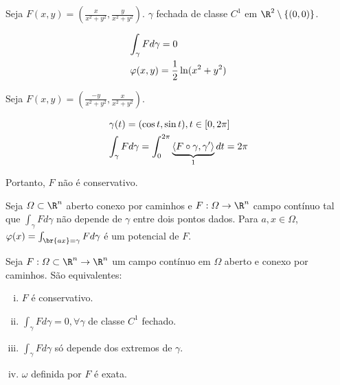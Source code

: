 \documentclass{book}
\begin{document}
\begin{ex}
Seja $F(x,y) = \left( {\frac{x}{{x^2  + y^2 }},\frac{y}{{x^2  + y^2 }}} \right)$. $\gamma$ fechada de classe $C^1$ em $\R^2 \setminus \{ (0,0) \}$.

\[
\begin{gathered}
  \int_\gamma Fd\gamma = 0 \hfill \\
  \varphi(x,y) = \frac{1}{2} \ln(x^2 + y^2) \hfill \\ 
\end{gathered} 
\]
\end{ex}

\begin{ex}
Seja $F(x,y) = \left( \frac{-y}{x^2 + y^2},\frac{x}{x^2 + y^2} \right)$.

\[
\begin{gathered}
  \gamma(t) = (\cos t, \sin t), t \in [0,2\pi] \hfill \\
  \int_\gamma Fd\gamma = \int_0^{2\pi} {\underbrace {\left\langle {F \circ \gamma ,\gamma '} \right\rangle }_1dt} = 2\pi \hfill \\ 
\end{gathered} 
\]

Portanto, $F$ n\~ao \'e conservativo.
\end{ex}

\begin{teo}
Seja $\varOmega \subset \R^n$ aberto conexo por caminhos e $F:\varOmega \to \R^n$ campo cont\'inuo tal que $\int_\gamma Fd\gamma$ n\~ao depende de $\gamma$ entre dois pontos dados. Para $a,x \in \varOmega$, $\varphi (x) = \int_{\br{ax}  = \gamma } {Fd\gamma }$ \'e um potencial de $F$.
\end{teo}

\begin{teo}
Seja $F:\varOmega \subset \R^n \to \R^n$ um campo cont\'inuo em $\varOmega$ aberto e conexo por caminhos. S\~ao equivalentes:

\begin{enumerate}[(i)]
 \item $F$ \'e conservativo.
 \item $\int_\gamma Fd\gamma = 0, \forall \gamma$ de classe $C^1$ fechado.
 \item $\int_\gamma Fd\gamma$ s\'o depende dos extremos de $\gamma$.
 \item $\omega$ definida por $F$ \'e exata.
\end{enumerate}

\end{teo}
\end{document}
